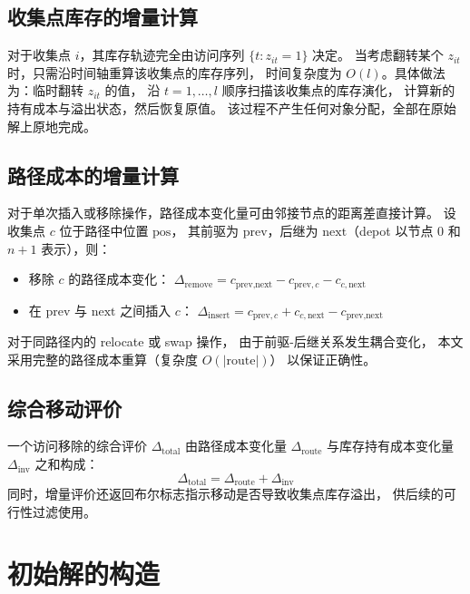 \documentclass{article}
\begin{document}
\subsection{收集点库存的增量计算}

对于收集点 $i$，其库存轨迹完全由访问序列 $\{t : z_{it}=1\}$ 决定。
当考虑翻转某个 $z_{it}$ 时，只需沿时间轴重算该收集点的库存序列，
时间复杂度为 $O(l)$。具体做法为：临时翻转 $z_{it}$ 的值，
沿 $t=1,\dots,l$ 顺序扫描该收集点的库存演化，
计算新的持有成本与溢出状态，然后恢复原值。
该过程不产生任何对象分配，全部在原始解上原地完成。

\subsection{路径成本的增量计算}

对于单次插入或移除操作，路径成本变化量可由邻接节点的距离差直接计算。
设收集点 $c$ 位于路径中位置 $\text{pos}$，
其前驱为 $\text{prev}$，后继为 $\text{next}$（depot 以节点 $0$ 和 $n{+}1$ 表示），则：

\begin{itemize}
  \item 移除 $c$ 的路径成本变化：
    $\Delta_{\text{remove}} = c_{\text{prev},\text{next}}
     - c_{\text{prev},c} - c_{c,\text{next}}$
  \item 在 $\text{prev}$ 与 $\text{next}$ 之间插入 $c$：
    $\Delta_{\text{insert}} = c_{\text{prev},c} + c_{c,\text{next}}
     - c_{\text{prev},\text{next}}$
\end{itemize}

对于同路径内的 relocate 或 swap 操作，
由于前驱-后继关系发生耦合变化，
本文采用完整的路径成本重算（复杂度 $O(|\text{route}|)$）
以保证正确性。

\subsection{综合移动评价}

一个访问移除的综合评价 $\Delta_{\text{total}}$ 由路径成本变化量
$\Delta_{\text{route}}$ 与库存持有成本变化量 $\Delta_{\text{inv}}$ 之和构成：
\begin{equation}
  \Delta_{\text{total}} = \Delta_{\text{route}} + \Delta_{\text{inv}}
  \label{eq:incremental-total}
\end{equation}
同时，增量评价还返回布尔标志指示移动是否导致收集点库存溢出，
供后续的可行性过滤使用。

\section{初始解的构造}
\label{sec:alns-initial}
\end{document}

